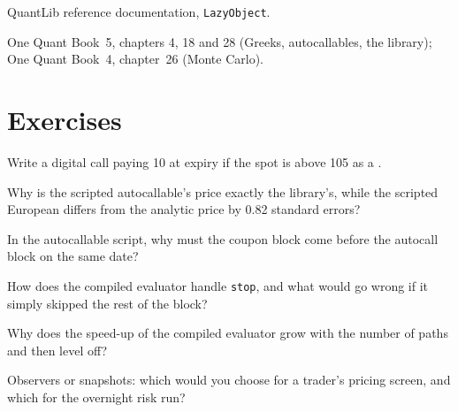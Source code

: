 \begin{omsources}
\item QuantLib reference documentation, \texttt{LazyObject}.
\item One Quant Book~5, chapters 4, 18 and 28 (Greeks, autocallables, the library); One Quant Book~4, chapter~26 (Monte Carlo).
\end{omsources}

\section{Exercises}

\begin{exercise}[$\star$]\label{exo:pl:pricing-library-architecture:1}
Write a digital call paying 10 at expiry if the spot is above 105 as a .
\end{exercise}

\begin{exercise}[$\star$]\label{exo:pl:pricing-library-architecture:2}
Why is the scripted autocallable's price exactly the library's, while the scripted European differs from the analytic price by 0.82
standard errors?
\end{exercise}

\begin{exercise}[$\star$]\label{exo:pl:pricing-library-architecture:3}
In the autocallable script, why must the coupon block come before the autocall block on the same date?
\end{exercise}

\begin{exercise}[$\star\star$]\label{exo:pl:pricing-library-architecture:4}
How does the compiled evaluator handle \texttt{stop}, and what would go wrong if it simply skipped the rest of the block?
\end{exercise}

\begin{exercise}[$\star\star$]\label{exo:pl:pricing-library-architecture:5}
Why does the speed-up of the compiled evaluator grow with the number of paths and then level off?
\end{exercise}

\begin{exercise}[$\star\star$]\label{exo:pl:pricing-library-architecture:6}
Observers or snapshots: which would you choose for a trader's pricing screen, and which for the overnight risk run?
\end{exercise}

